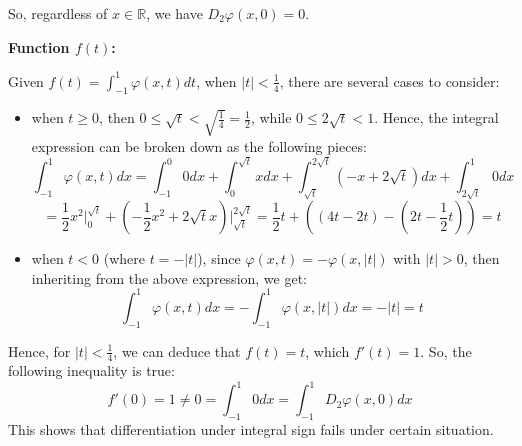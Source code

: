 \documentclass{article}
\begin{document}
So, regardless of $x\in\mathbb{R}$, we have $D_2\varphi(x,0)=0$.

\hfil

\textbf{Function $f(t)$:}

Given $f(t)=\int_{-1}^{1}\varphi(x,t)dt$, when $|t|<\frac{1}{4}$, there are several cases to consider:
\begin{itemize}
    \item when $t\geq 0$, then $0\leq \sqrt{t}<\sqrt{\frac{1}{4}}=\frac{1}{2}$, while $0\leq 2\sqrt{t}<1$. Hence, the integral expression can be broken down as the following pieces:
    $$\int_{-1}^{1}\varphi(x,t)dx=\int_{-1}^{0}0 dx + \int_{0}^{\sqrt{t}}x dx + \int_{\sqrt{t}}^{2\sqrt{t}}(-x+2\sqrt{t})dx + \int_{2\sqrt{t}}^{1}0 dx$$
    $$ = \frac{1}{2}x^2\bigg|_{0}^{\sqrt{t}}+\left(-\frac{1}{2}x^2+2\sqrt{t}x\right)\bigg|_{\sqrt{t}}^{2\sqrt{t}} = \frac{1}{2}t + ((4t-2t)-(2t-\frac{1}{2}t)) = t$$
    \item when $t<0$ (where $t=-|t|$), since $\varphi(x,t)=-\varphi(x,|t|)$ with $|t|>0$, then inheriting from the above expression, we get:
    $$\int_{-1}^{1}\varphi(x,t)dx = -\int_{-1}^{1}\varphi(x,|t|)dx = -|t| = t$$
\end{itemize}
Hence, for $|t|<\frac{1}{4}$, we can deduce that $f(t) = t$, which $f'(t)=1$. So, the following inequality is true:
$$f'(0) = 1 \neq 0 = \int_{-1}^{1}0dx = \int_{-1}^{1}D_2\varphi(x,0)dx$$
This shows that differentiation under integral sign fails under certain situation.

\break
\end{document}
